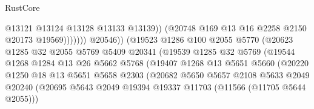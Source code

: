 \begin{lexlean}{RustCore}
\begin{coremodule}
                                                  @13121
                                                  @13124
                                                  @13128
                                                  @13133
                                                  @13139))
                                              (@20748 @169 @13 @16 @2258 @2150 @20173 @19569)))))))
                                  @20546))
                              (@19523
                                @1286
                                @100
                                @2055
                                @5770
                                (@20623
                                  @1285
                                  @32
                                  @2055
                                  @5769
                                  @5409
                                  @20341
                                  (@19539
                                    @1285
                                    @32
                                    @5769
                                    (@19544
                                      @1268
                                      @1284
                                      @13
                                      @26
                                      @5662
                                      @5768
                                      (@19407
                                        @1268
                                        @13
                                        @5651
                                        @5660
                                        (@20220
                                          @1250
                                          @18
                                          @13
                                          @5651
                                          @5658
                                          @2303
                                          (@20682
                                            @5650
                                            @5657
                                            @2108
                                            @5633
                                            @2049
                                            @20240
                                            (@20695
                                              @5643
                                              @2049
                                              @19394
                                              @19337
                                              @11703
                                              (@11566 (@11705 @5644 @2055)))

\end{coremodule}
\end{lexlean}
